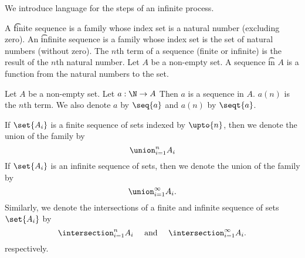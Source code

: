 

We introduce language for the steps of an infinite process.


A \t{finite sequence} is a family whose index set is a natural number (excluding zero).
An \t{infinite sequence} is a family whose index set is the set of natural numbers (without zero).
The \t{$n$th term} of a sequence (finite or infinite) is the result of the $n$th natural number.
Let $A$ be a non-empty set.
A sequence \t{in} $A$ is a function from the natural numbers to the set.


Let $A$ be a non-empty set.
Let $a: \N \to A$
Then $a$ is a sequence in $A$.
$a(n)$ is the $n$th term.
We also denote $a$ by
$\seq{a}$ and $a(n)$ by $\seqt{a}$.



If $\set{A_i}$ is a finite sequence of sets indexed by $\upto{n}$, then we denote the union of the family by
\[
  \union_{i = 1}^{n} A_i
\]
If $\set{A_i}$ is an infinite sequence of sets, then we denote the union of the family by
\[
  \union_{i = 1}^{\infty} A_i.
\]
Similarly, we denote the intersections of a finite and infinite sequence of sets $\set{A_i}$ by
\[
  \intersection_{i = 1}^{n} A_i \quad \text{ and } \quad \intersection_{i = 1}^{\infty} A_i.
\]
respectively.

\blankpage

%



%
%
%
%
%
